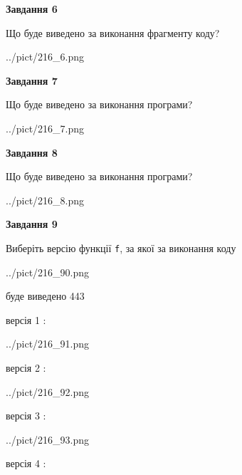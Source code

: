 \documentclass[12pt, ukrainian]{article}
\def\code#1{\Verb!#1!}
\begin{document}
{\begin {large}
{\begin {center}\textbf{Завдання 6}\end {center}}

Що буде виведено за виконання фрагменту коду?\par
\begin{center}
	{../pict/216_6.png}
\end{center}
\newpage

{\begin {center}\textbf{Завдання 7}\end {center}}

Що буде виведено за виконання програми?\par
\begin{center}
	{../pict/216_7.png}
\end{center}
\newpage

{\begin {center}\textbf{Завдання 8}\end {center}}

Що буде виведено за виконання програми?\par
\begin{center}
	{../pict/216_8.png}
\end{center}
\newpage

{\begin {center}\textbf{Завдання 9}\end {center}}

Виберіть версію функції \code{f}, за якої за виконання коду
\begin{center}
	{../pict/216_90.png}
\end{center}
буде виведено 443

\vspace{5mm}
версія 1 :

\begin{center}
	{../pict/216_91.png}
\end{center}
версія 2 :

\begin{center}
	{../pict/216_92.png}
\end{center}
версія 3 :

\begin{center}
	{../pict/216_93.png}
\end{center}
версія 4 :


\end{large}}
\end{document}
